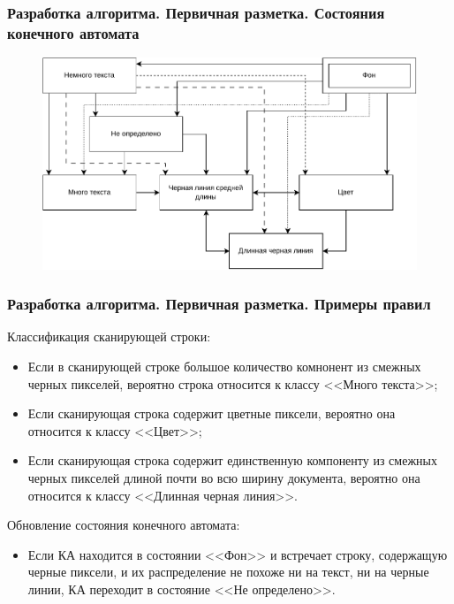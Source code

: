 \documentclass[gray]{beamer}
\begin{document}
\begin{frame}
    \frametitle{Разработка алгоритма. Первичная разметка. Состояния конечного автомата}
    \begin{figure}[H]
        \centering
        \includegraphics[width=\textwidth]{diag/fsm.full.pdf}
    \end{figure}
\end{frame}

\begin{frame}
    \frametitle{Разработка алгоритма. Первичная разметка. Примеры правил}
    Классификация сканирующей строки:
    \begin{itemize}
        \item Если в сканирующей строке большое количество комнонент из смежных черных пикселей, вероятно строка относится к классу <<Много текста>>;
        \item Если сканирующая строка содержит цветные пиксели, вероятно она относится к классу <<Цвет>>;
        \item Если сканирующая строка содержит единственную компоненту из смежных черных пикселей длиной почти во всю ширину документа, вероятно она относится к классу <<Длинная черная линия>>.
    \end{itemize}

    Обновление состояния конечного автомата:
    \begin{itemize}
        \item Если КА находится в состоянии <<Фон>> и встречает строку, содержащую черные пиксели, и их распределение не похоже ни на текст, ни на черные линии, КА переходит в состояние <<Не определено>>.
    \end{itemize}
\end{frame}
\end{document}
